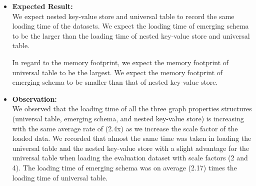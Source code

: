 {\begin{itemize}
\begin{table}[H]
\centering
{}
\caption{Evaluation results of graph properties structures scalability.}
\label{tbl-EvalResults-Scal-Properties}
\end{table}


\item \textbf{Expected Result:}\\
We expect nested key-value store and universal table to record the same loading time of the datasets. We expect the loading time of emerging schema to be the larger than the loading time of nested key-value store and universal table.

In regard to the memory footprint, we expect the memory footprint of universal table to be the largest. We expect the memory footprint of emerging schema to be smaller than that of nested key-value store.


\item \textbf{Observation:}\\
We observed that the loading time of all the three graph properties structures (universal table, emerging schema, and nested key-value store) is increasing with the same average rate of (2.4x) as we increase the scale factor of the loaded data. We recorded that almost the same time was taken in loading the universal table and the nested key-value store with a slight advantage for the universal table when loading the evaluation dataset with scale factors (2 and 4). The loading time of emerging schema was on average (2.17) times the loading time of universal table.


\end{itemize}}
